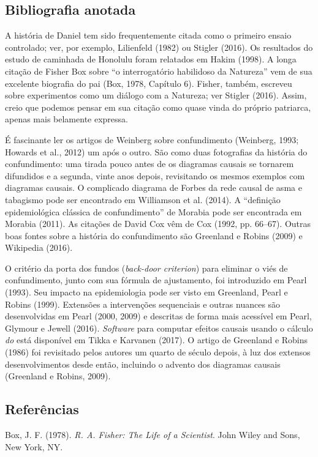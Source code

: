\documentclass[11pt,a5paper,twoside]{book}
\begin{document}
\subsection{Bibliografia anotada}
A história de Daniel tem sido frequentemente citada como o primeiro ensaio controlado; ver, por exemplo, Lilienfeld (1982) ou Stigler (2016). Os resultados do estudo de caminhada de Honolulu foram relatados em Hakim (1998). A longa citação de Fisher Box sobre “o interrogatório habilidoso da Natureza” vem de sua excelente biografia do pai (Box, 1978, Capítulo 6). Fisher, também, escreveu sobre experimentos como um diálogo com a Natureza; ver Stigler (2016). Assim, creio que podemos pensar em sua citação como quase vinda do próprio patriarca, apenas mais belamente expressa.

É fascinante ler os artigos de Weinberg sobre confundimento (Weinberg, 1993; Howards et al., 2012) um após o outro. São como duas fotografias da história do confundimento: uma tirada pouco antes de os diagramas causais se tornarem difundidos e a segunda, vinte anos depois, revisitando os mesmos exemplos com diagramas causais. O complicado diagrama de Forbes da rede causal de asma e tabagismo pode ser encontrado em Williamson et al. (2014). A “definição epidemiológica clássica de confundimento” de Morabia pode ser encontrada em Morabia (2011). As citações de David Cox vêm de Cox (1992, pp. 66–67). Outras boas fontes sobre a história do confundimento são Greenland e Robins (2009) e Wikipedia (2016).

O critério da porta dos fundos (\textit{back-door criterion}) para eliminar o viés de confundimento, junto com sua fórmula de ajustamento, foi introduzido em Pearl (1993). Seu impacto na epidemiologia pode ser visto em Greenland, Pearl e Robins (1999). Extensões a intervenções sequenciais e outras nuances são desenvolvidas em Pearl (2000, 2009) e descritas de forma mais acessível em Pearl, Glymour e Jewell (2016). \textit{Software} para computar efeitos causais usando o cálculo \textit{do} está disponível em Tikka e Karvanen (2017). O artigo de Greenland e Robins (1986) foi revisitado pelos autores um quarto de século depois, à luz dos extensos desenvolvimentos desde então, incluindo o advento dos diagramas causais (Greenland e Robins, 2009).

\subsection{Referências}
Box, J. F. (1978). \textit{R. A. Fisher: The Life of a Scientist}. John Wiley and Sons, New York, NY.
\end{document}
